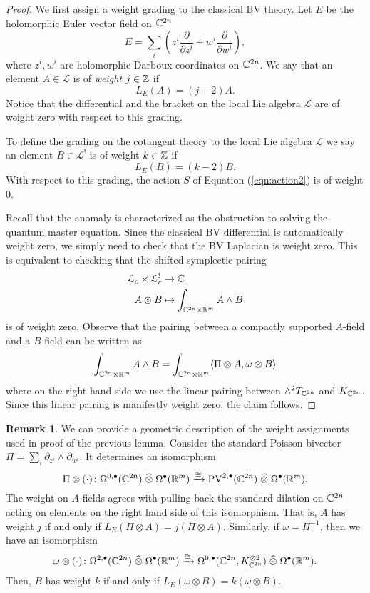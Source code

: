 \documentclass[11pt, oneside, reqno]{amsart}
\theoremstyle{definition} \newtheorem{definition}{Definition}[section]
\theoremstyle{definition}
\theoremstyle{remark}
\theoremstyle{definition} \newtheorem{remark}[definition]{Remark}
\theoremstyle{definition} \newtheorem{remarks}[definition]{Remarks}
\theoremstyle{definition} \newtheorem{question}[definition]{Question}
\theoremstyle{definition} \newtheorem*{note}{Note}
\theoremstyle{definition} \newtheorem{example}[definition]{Example}
\theoremstyle{definition} \newtheorem{examples}[definition]{Examples}
\def\bu{\bullet}
\def\Hat{\widehat}
\def\xto{\xrightarrow}
\def\<{\langle}
\def\>{\rangle}
\newcommand{\mc}[1]{\mathcal{#1}}
\begin{document}
\begin{proof}
We first assign a weight grading to the classical BV theory. 
Let $E$ be the holomorphic Euler vector field on $\mathbb C^{2n}$
\[E = \sum_i \left(z^i \frac{\partial}{\partial z^i} + w^i \frac{\partial}{\partial w^i} \right),\]
where $z^i, w^i$ are holomorphic Darboux coordinates on $\mathbb C^{2n}$.  We say that an element $A \in \mc L$ is of {\em weight} $j \in \mathbb Z$ if 
\[L_E (A) = (j + 2) A .\]
Notice that the differential and the bracket on the local Lie algebra $\mc L$ are of weight zero with respect to this grading. 

To define the grading on the cotangent theory to the local Lie algebra $\mc L$ we say an element $B \in \mc L^!$ is of weight $k \in \mathbb Z$ if
\[L_E (B) = (k-2) B .\]
With respect to this grading, the action $S$ of Equation (\ref{eqn:action2}) is of weight 0.  

Recall that the anomaly is characterized as the obstruction to solving the quantum master equation. 
Since the classical BV differential is automatically weight zero, we simply need to check that the BV Laplacian is weight zero. 
This is equivalent to checking that the shifted symplectic pairing
\begin{align*}
\mathcal L_c \times \mathcal L_c^! & \to \mathbb C \\
A \otimes B & \mapsto \int_{\mathbb C^{2n} \times \mathbb R^m} A \wedge B
\end{align*}
is of weight zero. 
Observe that the pairing between a compactly supported $A$-field and a $B$-field can be written as
\[
\int_{\CC^{2n} \times \RR^m} A \wedge B = \int_{\CC^{2n} \times \RR^m} \<\Pi \otimes A, \omega \otimes B\>
\]
where on the right hand side we use the linear pairing between $\wedge^2 T_{\mathbb C^{2n}}$ and $K_{\mathbb C^{2n}}$. 
Since this linear pairing is manifestly weight zero, the claim follows. 

\end{proof}

\begin{remark}
We can provide a geometric description of the weight assignments used in proof of the previous lemma.
Consider the standard Poisson bivector $\Pi = \sum_i \partial_{z^i} \wedge\partial_{w^i}$.
It determines an isomorphism
\[
\Pi \otimes ( \cdot ) \colon \Omega^{0,\bu}(\CC^{2n}) \; \Hat{\otimes} \; \Omega^{\bu}(\RR^m) \xto{\cong} {\rm PV}^{2,\bu}(\CC^{2n}) \;\Hat{\otimes}\; \Omega^\bu(\RR^m) .
\]
The weight on $A$-fields agrees with pulling back the standard dilation on $\mathbb C^{2n}$ acting on elements on the right hand side of this isomorphism. 
That is, $A$ has weight $j$ if and only if $L_E(\Pi \otimes A) = j (\Pi \otimes A)$. 
Similarly, if $\omega = \Pi^{-1}$, then we have an isomorphism
\[
\omega \otimes (\cdot ) \colon \Omega^{2,\bu}(\CC^{2n}) \; \Hat{\otimes} \; \Omega^{\bu}(\RR^m) \xto{\cong} \Omega^{0,\bu}(\CC^{2n}, K_{\CC^{2n}}^{\otimes 2}) \;\Hat{\otimes}\; \Omega^\bu(\RR^m) .
\]
Then, $B$ has weight $k$ if and only if $L_E(\omega \otimes B) = k (\omega \otimes B)$. 
\end{remark}
\end{document}
